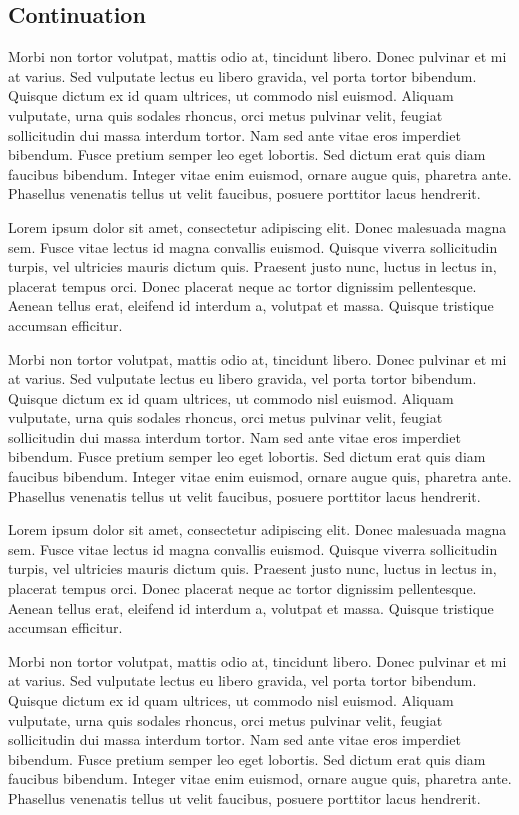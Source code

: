 \documentclass[b5paper]{scrbook}
\begin{document}
\subsection{Continuation}
Morbi non tortor volutpat, mattis odio at, tincidunt libero.
Donec pulvinar et mi at varius.
Sed vulputate lectus eu libero gravida, vel porta tortor bibendum.
Quisque dictum ex id quam ultrices, ut commodo nisl euismod.
Aliquam vulputate, urna quis sodales rhoncus, orci metus pulvinar velit, feugiat sollicitudin dui massa interdum tortor.
Nam sed ante vitae eros imperdiet bibendum.
Fusce pretium semper leo eget lobortis.
Sed dictum erat quis diam faucibus bibendum.
Integer vitae enim euismod, ornare augue quis, pharetra ante.
Phasellus venenatis tellus ut velit faucibus, posuere porttitor lacus hendrerit.

Lorem ipsum dolor sit amet, consectetur adipiscing elit.
Donec malesuada magna sem.
Fusce vitae lectus id magna convallis euismod.
Quisque viverra sollicitudin turpis, vel ultricies mauris dictum quis.
Praesent justo nunc, luctus in lectus in, placerat tempus orci.
Donec placerat neque ac tortor dignissim pellentesque.
Aenean tellus erat, eleifend id interdum a, volutpat et massa.
Quisque tristique accumsan efficitur.

Morbi non tortor volutpat, mattis odio at, tincidunt libero.
Donec pulvinar et mi at varius.
Sed vulputate lectus eu libero gravida, vel porta tortor bibendum.
Quisque dictum ex id quam ultrices, ut commodo nisl euismod.
Aliquam vulputate, urna quis sodales rhoncus, orci metus pulvinar velit, feugiat sollicitudin dui massa interdum tortor.
Nam sed ante vitae eros imperdiet bibendum.
Fusce pretium semper leo eget lobortis.
Sed dictum erat quis diam faucibus bibendum.
Integer vitae enim euismod, ornare augue quis, pharetra ante.
Phasellus venenatis tellus ut velit faucibus, posuere porttitor lacus hendrerit.

Lorem ipsum dolor sit amet, consectetur adipiscing elit.
Donec malesuada magna sem.
Fusce vitae lectus id magna convallis euismod.
Quisque viverra sollicitudin turpis, vel ultricies mauris dictum quis.
Praesent justo nunc, luctus in lectus in, placerat tempus orci.
Donec placerat neque ac tortor dignissim pellentesque.
Aenean tellus erat, eleifend id interdum a, volutpat et massa.
Quisque tristique accumsan efficitur.

Morbi non tortor volutpat, mattis odio at, tincidunt libero.
Donec pulvinar et mi at varius.
Sed vulputate lectus eu libero gravida, vel porta tortor bibendum.
Quisque dictum ex id quam ultrices, ut commodo nisl euismod.
Aliquam vulputate, urna quis sodales rhoncus, orci metus pulvinar velit, feugiat sollicitudin dui massa interdum tortor.
Nam sed ante vitae eros imperdiet bibendum.
Fusce pretium semper leo eget lobortis.
Sed dictum erat quis diam faucibus bibendum.
Integer vitae enim euismod, ornare augue quis, pharetra ante.
Phasellus venenatis tellus ut velit faucibus, posuere porttitor lacus hendrerit.
\end{document}
